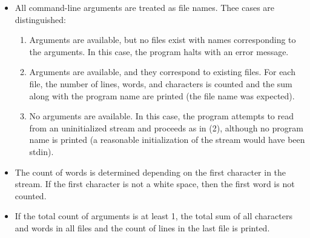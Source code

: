 \begin{itemize}

\item All command-line arguments are treated as file names.
Thee cases are distinguished:

\begin{enumerate}
\item Arguments are available, but no files exist with names 
corresponding to the arguments.
In this case, the program halts with an error message.

\item Arguments are available, and they correspond to existing files.
For each file, the number of lines, words, and characters
is counted and the sum along with the program name are printed
(the file name was expected).

\item  No arguments are available.  In this case, the program
attempts to read from an uninitialized stream and proceeds as in (2),
although no program name is printed (a reasonable initialization
of the stream would have been stdin).

\end{enumerate}

\item The count of words is determined depending on the first character 
in the stream.
If the first character is not a white space, then the first word is
not counted.

\item If the total count of arguments is at least 1, the total sum of 
all characters and words in all files and the count of lines in the last
file is printed.


\end{itemize}
